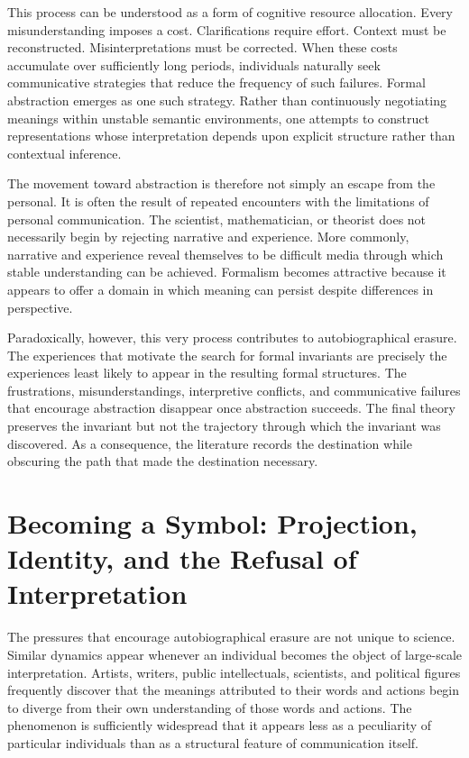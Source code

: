 \documentclass[11pt]{article}
\theoremstyle{plain}
\begin{document}
This process can be understood as a form of cognitive resource allocation. Every misunderstanding imposes a cost. Clarifications require effort. Context must be reconstructed. Misinterpretations must be corrected. When these costs accumulate over sufficiently long periods, individuals naturally seek communicative strategies that reduce the frequency of such failures. Formal abstraction emerges as one such strategy. Rather than continuously negotiating meanings within unstable semantic environments, one attempts to construct representations whose interpretation depends upon explicit structure rather than contextual inference.

The movement toward abstraction is therefore not simply an escape from the personal. It is often the result of repeated encounters with the limitations of personal communication. The scientist, mathematician, or theorist does not necessarily begin by rejecting narrative and experience. More commonly, narrative and experience reveal themselves to be difficult media through which stable understanding can be achieved. Formalism becomes attractive because it appears to offer a domain in which meaning can persist despite differences in perspective.

Paradoxically, however, this very process contributes to autobiographical erasure. The experiences that motivate the search for formal invariants are precisely the experiences least likely to appear in the resulting formal structures. The frustrations, misunderstandings, interpretive conflicts, and communicative failures that encourage abstraction disappear once abstraction succeeds. The final theory preserves the invariant but not the trajectory through which the invariant was discovered. As a consequence, the literature records the destination while obscuring the path that made the destination necessary.

\section{Becoming a Symbol: Projection, Identity, and the Refusal of Interpretation}

The pressures that encourage autobiographical erasure are not unique to science. Similar dynamics appear whenever an individual becomes the object of large-scale interpretation. Artists, writers, public intellectuals, scientists, and political figures frequently discover that the meanings attributed to their words and actions begin to diverge from their own understanding of those words and actions. The phenomenon is sufficiently widespread that it appears less as a peculiarity of particular individuals than as a structural feature of communication itself.
\end{document}
